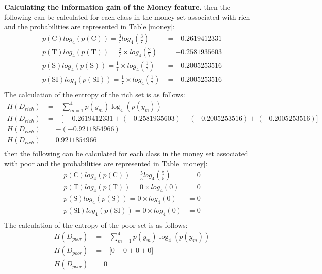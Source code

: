 \documentclass[10pt]{article}
\begin{document}
\textbf{Calculating the information gain of the Money feature.}
then the following can be calculated for each class in the money set associated with rich and the probabilities
are represented in Table \ref{money}:
\begin{align*}
    p(\text{C}) log_4 \left( p(\text{C}) \right) = \frac{3}{7} log_4 \left( \frac{3}{7} \right) &= -0.2619412331\\
    p(\text{T}) log_4 \left( p(\text{T}) \right) = \frac{2}{7} \times log_4 \left( \frac{2}{7} \right) &= -0.2581935603\\
    p(\text{S}) log_4 \left( p(\text{S}) \right) = \frac{1}{7} \times log_4 \left( \frac{1}{7} \right) &= -0.2005253516\\
    p(\text{SI}) log_4 \left( p(\text{SI}) \right) = \frac{1}{7} \times log_4 \left( \frac{1}{7} \right) &= -0.2005253516\\
\end{align*}
The calculation of the entropy of the rich set is as follows:
\begin{align*}
    H(D_{rich}) &= - \sum_{m=1}^{4} p(y_m) \log_4 \left( p(y_m) \right) \\
    H(D_{rich}) &= - \big[ -0.2619412331 + (-0.2581935603) + (-0.2005253516) + (-0.2005253516)\big] \\
    H(D_{rich}) &= -(-0.9211854966) \\
    H(D_{rich}) &= 0.9211854966 \\
\end{align*}
then the following can be calculated for each class in the money set associated with poor and the probabilities
are represented in Table \ref{money}:
\begin{align*}
    p(\text{C}) log_4 \left( p(\text{C}) \right) = \frac{5}{5} log_4 \left( \frac{5}{5} \right) &= 0\\
    p(\text{T}) log_4 \left( p(\text{T}) \right) = 0 \times log_4 \left( 0 \right) &= 0\\
    p(\text{S}) log_4 \left( p(\text{S}) \right) = 0 \times log_4 \left( 0 \right) &= 0\\
    p(\text{SI}) log_4 \left( p(\text{SI}) \right) = 0 \times log_4 \left( 0 \right) &= 0\\
\end{align*}
The calculation of the entropy of the poor set is as follows:
\begin{align*}
    H(D_{poor}) &= - \sum_{m=1}^{4} p(y_m) \log_4 \left( p(y_m) \right) \\
    H(D_{poor}) &= - \big[ 0 + 0 + 0 + 0\big] \\
    H(D_{poor}) &= 0 \\
\end{align*}
\end{document}
